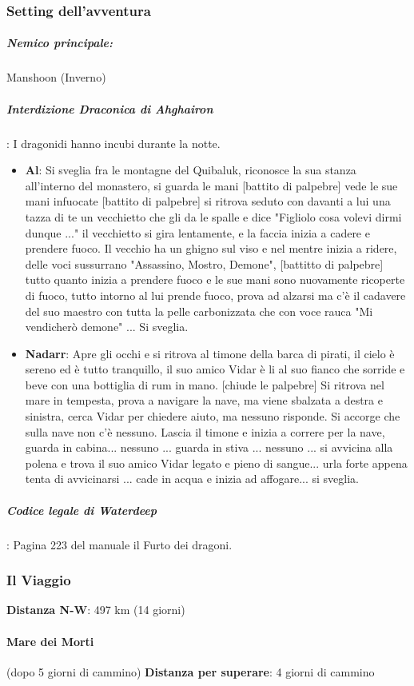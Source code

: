 \documentclass{article}
\begin{document}
\subsubsection{Setting dell'avventura}
\subparagraph{Nemico principale: } Manshoon (Inverno)
\subparagraph{Interdizione Draconica di Ahghairon}: I dragonidi hanno incubi durante la notte. 
\begin{itemize}
    \item \textbf{Al}: Si sveglia fra le montagne del Quibaluk, riconosce la sua stanza all'interno del monastero, si guarda le mani [battito di palpebre] vede le sue mani infuocate [battito di palpebre] si ritrova seduto con davanti a lui una tazza di te un vecchietto che gli da le spalle e dice "Figliolo cosa volevi dirmi dunque ..." il vecchietto si gira lentamente, e la faccia inizia a cadere e prendere fuoco. Il vecchio ha un ghigno sul viso e nel mentre inizia a ridere, delle voci sussurrano "Assassino, Mostro, Demone", [battitto di palpebre] tutto quanto inizia a prendere fuoco e le sue mani sono nuovamente ricoperte di fuoco, tutto intorno al lui prende fuoco, prova ad alzarsi ma c'è il cadavere del suo maestro con tutta la pelle carbonizzata che con voce rauca "Mi vendicherò demone" ... Si sveglia.
    \item \textbf{Nadarr}: Apre gli occhi e si ritrova al timone della barca di pirati, il cielo è sereno ed è tutto tranquillo, il suo amico Vidar è li al suo fianco che sorride e beve con una bottiglia di rum in mano. [chiude le palpebre] Si ritrova nel mare in tempesta, prova a navigare la nave, ma viene sbalzata a destra e sinistra, cerca Vidar per chiedere aiuto, ma nessuno risponde. Si accorge che sulla nave non c'è nessuno. Lascia il timone e inizia a correre per la nave, guarda in cabina... nessuno ... guarda in stiva ... nessuno ... si avvicina alla polena e trova il suo amico Vidar legato e pieno di sangue... urla forte appena tenta di avvicinarsi ... cade in acqua e inizia ad affogare... si sveglia. 
\end{itemize}

\subparagraph{Codice legale di Waterdeep}:  Pagina 223 del manuale il Furto dei dragoni.

\subsubsection{Il Viaggio}
\textbf{Distanza N-W}: 497 km (14 giorni) 

\paragraph{Mare dei Morti} (dopo 5 giorni di cammino) 
\textbf{Distanza per superare}: 4 giorni di cammino
\end{document}
